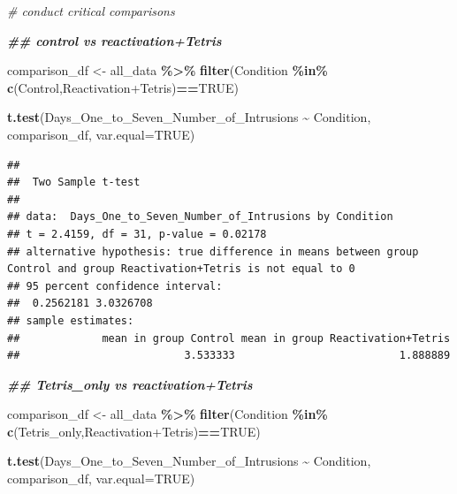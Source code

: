 \documentclass[
]{book}
\newenvironment{Shaded}{\begin{snugshade}}{\end{snugshade}}
\newcommand{\AttributeTok}[1]{\textcolor[rgb]{0.13,0.29,0.53}{#1}}
\newcommand{\CommentTok}[1]{\textcolor[rgb]{0.56,0.35,0.01}{\textit{#1}}}
\newcommand{\ConstantTok}[1]{\textcolor[rgb]{0.56,0.35,0.01}{#1}}
\newcommand{\DocumentationTok}[1]{\textcolor[rgb]{0.56,0.35,0.01}{\textbf{\textit{#1}}}}
\newcommand{\FunctionTok}[1]{\textcolor[rgb]{0.13,0.29,0.53}{\textbf{#1}}}
\newcommand{\NormalTok}[1]{#1}
\newcommand{\OtherTok}[1]{\textcolor[rgb]{0.56,0.35,0.01}{#1}}
\newcommand{\SpecialCharTok}[1]{\textcolor[rgb]{0.81,0.36,0.00}{\textbf{#1}}}
\newcommand{\StringTok}[1]{\textcolor[rgb]{0.31,0.60,0.02}{#1}}
\begin{document}
\begin{Shaded}
\begin{Highlighting}[]
\CommentTok{\# conduct critical comparisons}

\DocumentationTok{\#\# control vs reactivation+Tetris}

\NormalTok{comparison\_df }\OtherTok{\textless{}{-}}\NormalTok{ all\_data }\SpecialCharTok{\%\textgreater{}\%} 
                  \FunctionTok{filter}\NormalTok{(Condition }\SpecialCharTok{\%in\%} \FunctionTok{c}\NormalTok{(}\StringTok{\textquotesingle{}Control\textquotesingle{}}\NormalTok{,}\StringTok{\textquotesingle{}Reactivation+Tetris\textquotesingle{}}\NormalTok{)}\SpecialCharTok{==}\ConstantTok{TRUE}\NormalTok{)}
                        
\FunctionTok{t.test}\NormalTok{(Days\_One\_to\_Seven\_Number\_of\_Intrusions }\SpecialCharTok{\textasciitilde{}}\NormalTok{ Condition, }
\NormalTok{       comparison\_df,}
       \AttributeTok{var.equal=}\ConstantTok{TRUE}\NormalTok{)}
\end{Highlighting}
\end{Shaded}

\begin{verbatim}
## 
##  Two Sample t-test
## 
## data:  Days_One_to_Seven_Number_of_Intrusions by Condition
## t = 2.4159, df = 31, p-value = 0.02178
## alternative hypothesis: true difference in means between group Control and group Reactivation+Tetris is not equal to 0
## 95 percent confidence interval:
##  0.2562181 3.0326708
## sample estimates:
##             mean in group Control mean in group Reactivation+Tetris 
##                          3.533333                          1.888889
\end{verbatim}

\begin{Shaded}
\begin{Highlighting}[]
\DocumentationTok{\#\# Tetris\_only vs reactivation+Tetris}

\NormalTok{comparison\_df }\OtherTok{\textless{}{-}}\NormalTok{ all\_data }\SpecialCharTok{\%\textgreater{}\%} 
                  \FunctionTok{filter}\NormalTok{(Condition }\SpecialCharTok{\%in\%} \FunctionTok{c}\NormalTok{(}\StringTok{\textquotesingle{}Tetris\_only\textquotesingle{}}\NormalTok{,}\StringTok{\textquotesingle{}Reactivation+Tetris\textquotesingle{}}\NormalTok{)}\SpecialCharTok{==}\ConstantTok{TRUE}\NormalTok{)}
                        
\FunctionTok{t.test}\NormalTok{(Days\_One\_to\_Seven\_Number\_of\_Intrusions }\SpecialCharTok{\textasciitilde{}}\NormalTok{ Condition, }
\NormalTok{       comparison\_df,}
       \AttributeTok{var.equal=}\ConstantTok{TRUE}\NormalTok{)}
\end{Highlighting}
\end{Shaded}
\end{document}
